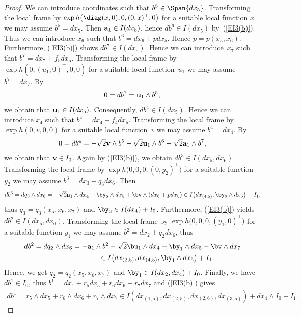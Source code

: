 \begin{proof} We can introduce coordinates such that $b^5\in\Span\{dx_5\}$. Transforming the local frame by $\exp h\big(\diag(x,0),0,(0,x)^\top,0\big)$ for a suitable local function $x$ we may assume $b^5=dx_5$. 	 Then ${\bf a}_ 1 \in I(dx_5)$, hence $db^6\in I(dx_5)$ by~(\ref{EI3(b)}). Thus we can introduce $x_6$ such that $b^6=dx_6 +p dx_5$. Hence $p=p(x_5,x_6)$. Furthermore, (\ref{EI3(b)}) shows $db^7\in I(dx_5)$. Hence we can introduce~$x_7$ such that $b^7=dx_7+f_5 dx_5$. Transforming the local frame by $\exp h(0,(u_1,0)^\top,0,0)$ for a suitable local function~$u_1$ we may assume $b^7=dx_7$. By
\begin{gather*}
0 = d b^7 = {\bf u}_1 \wedge b^5,
\end{gather*}
we obtain that ${\bf u}_1 \in I (dx_5)$. Consequently, $db^4 \in I(dx_5)$. Hence we can introduce $x_4$ such that $b^4 = dx_4 + f_4 dx_5$. Transforming the local frame by $\exp h(0, v, 0, 0)$ for a suitable local function~$v$ we may assume $b^4 = dx_4$. By
\begin{gather*}
0 = d b^4 = - \sqrt{2} {\bf v} \wedge b^5 - \sqrt{2} {\bf u}_1 \wedge b^6 - \sqrt{2} {\bf a}_1 \wedge b^7,
\end{gather*}
we obtain that ${\bf v} \in I_0$. Again by (\ref{EI3(b)}), we obtain $db^3 \in I(dx_5,dx_6)$. Transforming the local frame by $\exp h\big(0,0,0,(0,y_2)^\top\big)$ for a suitable function $y_2$ we may assume $b^3 = dx_3 + q_3 dx_6$. Then
\begin{gather*}
db^3 = dq_3\wedge dx_6= -\sqrt2 {\bf a}_1 \wedge dx_4-\by_2\wedge dx_5+\bv\wedge (dx_6+pdx_5)
\in I\big(dx_{(4,5)}, \by_2\wedge dx_5\big)+I_1,\!
\end{gather*}
thus $q_3=q_3(x_5,x_6,x_7)$ and $\by_2\in I(dx_4)+I_0$. Furthermore, (\ref{EI3(b)}) yields $db^2\in I(dx_5,dx_6)$. Transforming the local frame by $\exp h\big(0,0,0,(y_1,0)^\top\big)$ for a suitable function $y_1$ we may assume $b^2=dx_2+q_2 dx_6$, thus
\begin{gather*}
db^2 = dq_2\wedge dx_6 = -{\bf a}_ 1 \wedge b^2 -\sqrt2 \bu_1\wedge dx_4-\by_1\wedge dx_5-\bv\wedge dx_7\\
\hphantom{db^2 = dq_2\wedge dx_6}{} \in I\big(dx_{(2,5)}, dx_{(4,5)}, \by_1\wedge dx_5\big)+I_1.
\end{gather*}
Hence, we get $q_2=q_2(x_5,x_6,x_7)$ and $\by_1\in I(dx_2, dx_4)+I_0$. Finally, we have $db^1\in I_0$, thus $b^1=dx_1+r_5dx_5+r_6dx_6+r_7dx_7$ and (\ref{EI3(b)}) gives
\begin{gather*}
db^1 = r_5\wedge dx_5+r_6\wedge dx_6+r_7\wedge dx_7
 \in I( dx_{(1,5)}, dx_{(2,5)}, dx_{(2,6)}, dx_{(3,5)} )+dx_4\wedge I_0 +I_1.
\end{gather*}


\end{proof}
